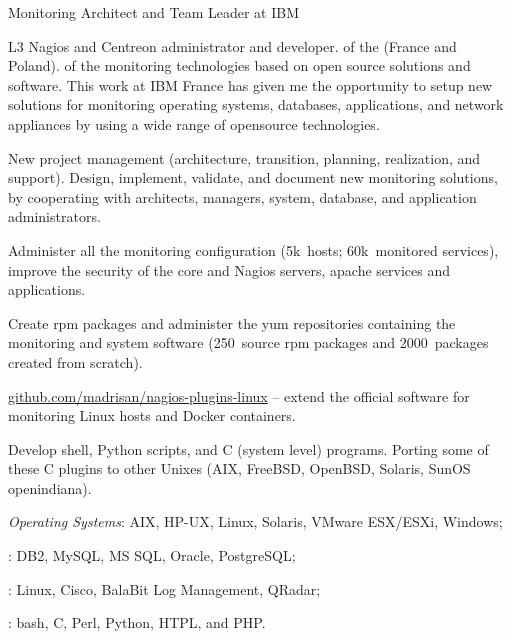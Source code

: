    {Monitoring Architect and Team Leader at IBM}

L3 Nagios and Centreon administrator and developer.
 of the 
(France and Poland).
 of the monitoring technologies based on open source
solutions and software.
This work at IBM France has given me the opportunity to setup new solutions 
for monitoring operating systems, databases, applications, and network 
appliances by using a wide range of opensource technologies.

\smallskip\noindent
\tasks
New project management
(architecture, transition, planning, realization, and support).
Design, implement, validate, and document new monitoring solutions,
by cooperating with architects, managers, system, database, and application 
administrators.

\tinyskip
Administer all the monitoring configuration
(5k\smallplus~hosts; 60k\smallplus~monitored services), improve the security
of the core and Nagios servers, apache services and applications.

\tinyskip
Create rpm packages and administer the yum repositories containing
the monitoring and system software (250\smallplus~source rpm packages and
2000~packages created from scratch).

\smallskip\noindent
\software
\url{github.com/madrisan/nagios-plugins-linux} --
extend the  official software for monitoring Linux
hosts and Docker containers.

Develop shell, Python scripts, and C (system level) programs.
Porting some of these C plugins to other Unixes
(AIX, FreeBSD, OpenBSD, Solaris, SunOS openindiana).

\tinyskip\noindent
\technologies
{\it Operating Systems\/}:
AIX, HP-UX, Linux, Solaris, VMware ESX/ESXi, Windows;
\par{}: DB2, MySQL, MS SQL, Oracle, PostgreSQL;
\par{}: Linux, Cisco,
BalaBit Log Management, QRadar;
\par{}: bash, C, Perl, Python, HTPL, and PHP.



